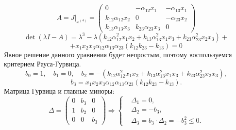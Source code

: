 \begin{enumerate}
            \[
                A = J \big|_{x^{(4)}} = \left(\begin{matrix}
                    0 & -\alpha_{12} x_1 & -\alpha_{13} x_1 \\
                    k_{12} \alpha_{12} x_2 & 0 & -\alpha_{23} x_2 \\
                    k_{13} \alpha_{13} x_3 & k_{23} \alpha_{23} x_3 & 0
                \end{matrix}\right)
            \]
            \[
                \det(\lambda I - A) = \lambda^3 - \lambda (k_{12} \alpha_{12}^2 x_1 x_2 + k_{13} \alpha_{13}^2 x_1 x_3 + k_{23} \alpha_{23}^2 x_2 x_3) +
            \]
            \[
                + x_1 x_2 x_3 \alpha_{12} \alpha_{13} \alpha_{23} (k_{12} k_{23} - k_{13}) = 0
            \]
            Явное решение данного уравнения будет непростым, поэтому воспользуемся критерием Рауса-Гурвица.
            \[
                b_0 = 1, \quad b_1 = 0, \quad b_2 = -(k_{12} \alpha_{12}^2 x_1 x_2 + k_{13} \alpha_{13}^2 x_1 x_3 + k_{23} \alpha_{23}^2 x_2 x_3),
            \]
            \[
                b_3 = x_1 x_2 x_3 \alpha_{12} \alpha_{13} \alpha_{23} (k_{12} k_{23} - k_{13}).
            \]
            Матрица Гурвица и главные миноры:
            \[
                \Delta = \left( \begin{matrix}
                    0 & b_3 & 0 \\
                    1 & b_2 & 0 \\
                    0   & 0 & b_3
                \end{matrix} \right)
                \Rightarrow 
                \left\{ \begin{split}
                    & \Delta_1 = 0, \\
                    & \Delta_2 = -b_3, \\
                    & \Delta_3 = b_3 \cdot \Delta_2 = -b_3^2 \leq 0.
                \end{split} \right.
            \]
    \end{enumerate}